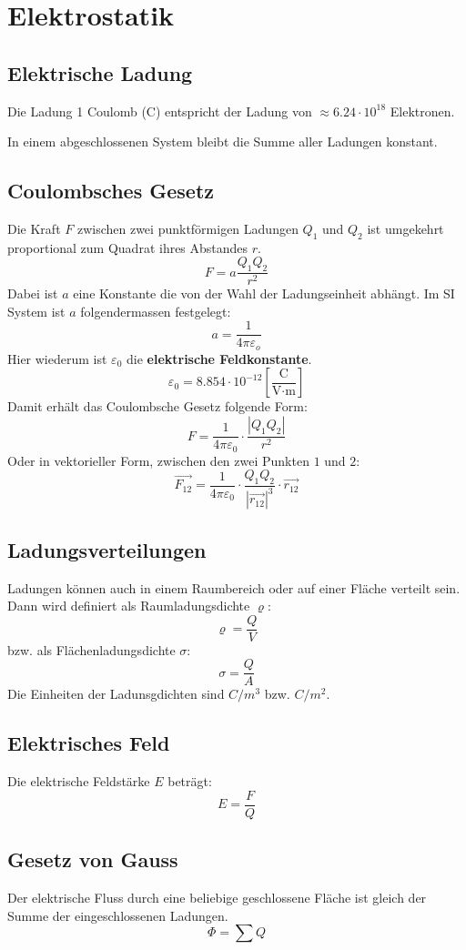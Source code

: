 \section{Elektrostatik}

\subsection{Elektrische Ladung}

Die Ladung 1 Coulomb (C) entspricht der Ladung von $\approx 6.24 \cdot 10^{18}$
Elektronen.

In einem abgeschlossenen System bleibt die Summe aller Ladungen konstant.

\subsection{Coulombsches Gesetz}

Die Kraft $F$ zwischen zwei punktförmigen Ladungen $Q_1$ und $Q_2$ ist umgekehrt
proportional zum Quadrat ihres Abstandes $r$.
\[
	F = a \frac{Q_1Q_2}{r^2}
\]
Dabei ist $a$ eine Konstante die von der Wahl der Ladungseinheit abhängt. Im SI
System ist $a$ folgendermassen festgelegt:
\[
	a = \frac{1}{4 \pi \varepsilon_o}
\]
Hier wiederum ist $\varepsilon_0$ die \textbf{elektrische Feldkonstante}.
\[
	\varepsilon_0 = 8.854 \cdot 10^{-12}
	\left[ \frac{\textrm{C}}{\textrm{V}\cdot \textrm{m}} \right]
\]
Damit erhält das Coulombsche Gesetz folgende Form:
\[
	F = \frac{1}{4\pi\varepsilon_0} \cdot \frac{|Q_1Q_2|}{r^2}
\]
Oder in vektorieller Form, zwischen den zwei Punkten $1$ und $2$:
\[
	\vec{F_{12}} = \frac{1}{4\pi\varepsilon_0}
	\cdot \frac{Q_1Q_2}{|\vec{r_{12}}|^3}
	\cdot \vec{r_{12}}
\]

\subsection{Ladungsverteilungen}

Ladungen können auch in einem Raumbereich oder auf einer Fläche verteilt sein.
Dann wird definiert als Raumladungsdichte $\varrho$:
\[
	\varrho = \frac{Q}{V}
\]
bzw. als Flächenladungsdichte $\sigma$:
\[
	\sigma = \frac{Q}{A}
\]
Die Einheiten der Ladunsgdichten sind $C/m^3$ bzw. $C/m^2$.

\subsection{Elektrisches Feld}

Die elektrische Feldstärke $E$ beträgt:
\[
	E = \frac{F}{Q}
\]

\subsection{Gesetz von Gauss}

Der elektrische Fluss durch eine beliebige geschlossene Fläche ist gleich der
Summe der eingeschlossenen Ladungen.
\[
	\Phi = \sum Q
\]
